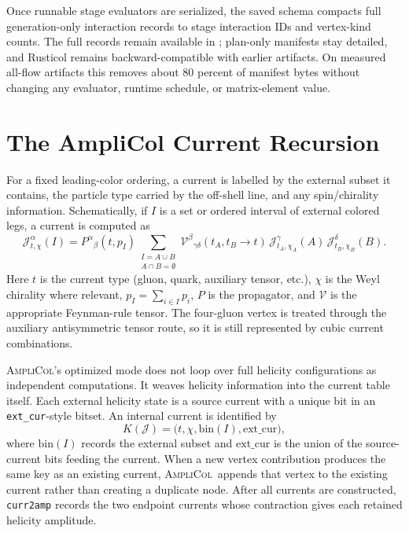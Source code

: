 \documentclass[10pt]{article}
\newcommand{\AC}{\textsc{AmpliCol}}
\newcommand{\J}{\mathcal{J}}
\newcommand{\V}{\mathcal{V}}
\begin{document}
Once runnable stage evaluators are serialized, the saved schema compacts full
generation-only interaction records to stage interaction IDs and vertex-kind
counts.  The full records remain available in
; plan-only manifests stay
detailed, and Rusticol remains backward-compatible with earlier artifacts.  On
measured all-flow artifacts this removes about 80 percent of manifest bytes
without changing any evaluator, runtime schedule, or matrix-element value.

\section{The AmpliCol Current Recursion}

For a fixed leading-color ordering, a current is labelled by the external
subset it contains, the particle type carried by the off-shell line, and any
spin/chirality information.  Schematically, if $I$ is a set or ordered interval
of external colored legs, a current is computed as
\begin{equation}
  \J^\alpha_{t,\chi}(I)
  =
  P^\alpha{}_\beta(t, p_I)
  \sum_{\substack{I=A\cup B\\A\cap B=\emptyset}}
  \V^\beta{}_{\gamma\delta}(t_A,t_B\to t)\,
  \J^\gamma_{t_A,\chi_A}(A)\,
  \J^\delta_{t_B,\chi_B}(B).
  \label{eq:current-recursion}
\end{equation}
Here $t$ is the current type (gluon, quark, auxiliary tensor, etc.),
$\chi$ is the Weyl chirality where relevant, $p_I=\sum_{i\in I}p_i$, $P$ is
the propagator, and $\V$ is the appropriate Feynman-rule tensor.  The
four-gluon vertex is treated through the auxiliary antisymmetric tensor route,
so it is still represented by cubic current combinations.

\AC's optimized mode does not loop over full helicity configurations as
independent computations.  It weaves helicity information into the current
table itself.  Each external helicity state is a source current with a unique
bit in an \texttt{ext\_cur}-style bitset.  An internal current is identified by
\begin{equation}
  K(\J)=\bigl(t,\chi,\mathrm{bin}(I),\mathrm{ext\_cur}\bigr),
  \label{eq:current-key}
\end{equation}
where $\mathrm{bin}(I)$ records the external subset and $\mathrm{ext\_cur}$ is
the union of the source-current bits feeding the current.  When a new vertex
contribution produces the same key as an existing current, \AC\ appends that
vertex to the existing current rather than creating a duplicate node.  After
all currents are constructed, \texttt{curr2amp} records the two endpoint
currents whose contraction gives each retained helicity amplitude.
\end{document}
